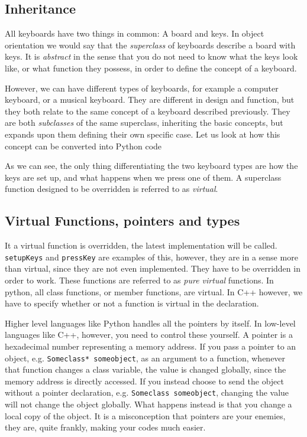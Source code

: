 \subsection{Inheritance}

All keyboards have two things in common: A board and keys. In object orientation we would say that the \textit{superclass} of keyboards describe a board with keys. It is \textit{abstract} in the sense that you do not need to know what the keys look like, or what function they possess, in order to define the concept of a keyboard.

However, we can have different types of keyboards, for example a computer keyboard, or a musical keyboard. They are different in design and function, but they both relate to the same concept of a keyboard described previously. They are both \textit{subclasses} of the same superclass, inheriting the basic concepts, but expands upon them defining their own specific case. Let us look at how this concept can be converted into Python code

\vspace{0.5 cm}


As we can see, the only thing differentiating the two keyboard types are how the keys are set up, and what happens when we press one of them. A superclass function designed to be overridden is referred to as \textit{virtual}. 

\subsection{Virtual Functions, pointers and types}

It a virtual function is overridden, the latest implementation will be called. \verb+setupKeys+ and \verb+pressKey+ are examples of this, however, they are in a sense more than virtual, since they are not even implemented. They have to be overridden in order to work. These functions are referred to as \textit{pure virtual} functions. In python, all class functions, or member functions, are virtual. In C++ however, we have to specify whether or not a function is virtual in the declaration. 

Higher level languages like Python handles all the pointers by itself. In low-level languages like C++, however, you need to control these yourself. A pointer is a hexadecimal number representing a memory address. If you pass a pointer to an object, e.g. \verb+Someclass* someobject+, as an argument to a function, whenever that function changes a class variable, the value is changed globally, since the memory address is directly accessed. If you instead choose to send the object without a pointer declaration, e.g. \verb+Someclass someobject+, changing the value will not change the object globally. What happens instead is that you change a local copy of the object. It is a misconception that pointers are your enemies, they are, quite frankly, making your codes much easier.

